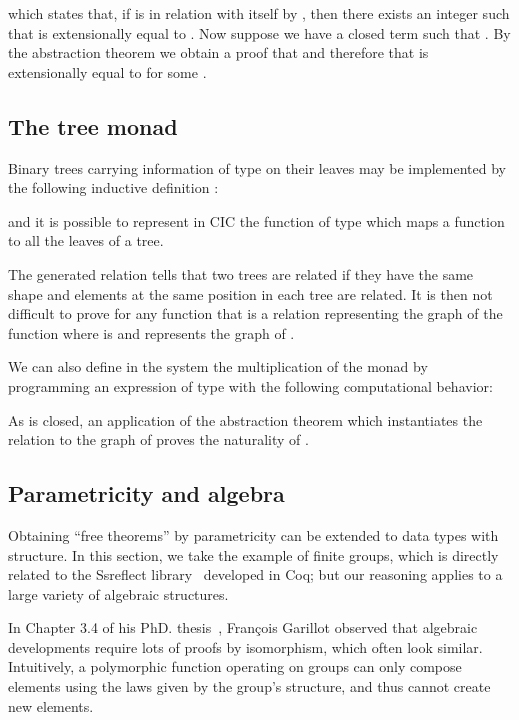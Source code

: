 \documentclass[a4paper,USenglish]{lipics}
\def\coq{\textsf{Coq}\xspace}
\def\cic{\textsf{CIC}\xspace}
\def\ssreflect{\textsf{Ssreflect}\xspace}
\begin{document}
which states that, if  is in relation with itself by ,
then there exists an integer  such that  is
extensionally equal to . Now suppose we have a
closed term  such that . By the abstraction theorem
we obtain a proof  that  and therefore that 
is extensionally equal to  for some .

\subsection{The tree monad}\label{sec:examples:tree}

Binary trees carrying information of type  on their leaves may be
implemented by the following inductive definition :

and it is possible to represent in \cic the function  of type
 which maps a
function to all the leaves of a tree.

The generated relation 
tells that two trees are related if they have the same shape and
elements at the same position in each tree are related. It is then not
difficult to prove for any function  that 
is a relation representing the graph of the  function where
 is  and represents the graph of .

We can also define in the system the multiplication of the monad by
programming an expression  of type  with the following computational behavior:
 
As  is closed, an application of the abstraction theorem which
instantiates the relation to the graph of  proves the naturality of
.


\subsection{Parametricity and algebra}\label{sec:examples:algebra}

Obtaining ``free theorems'' by parametricity can be extended to data
types with structure. In this section, we take the example of finite
groups, which is directly related to the \ssreflect
library~\cite{DBLP:conf/tphol/GonthierMRTT07} developed in \coq; but our
reasoning applies to a large variety of algebraic structures.

In Chapter 3.4 of his PhD. thesis~\cite{Garillot11}, François Garillot
observed that algebraic developments require lots of proofs by
isomorphism, which often look similar. Intuitively, a polymorphic function
operating on groups can only compose elements using the laws given by
the group's structure, and thus cannot create new elements.
\end{document}
